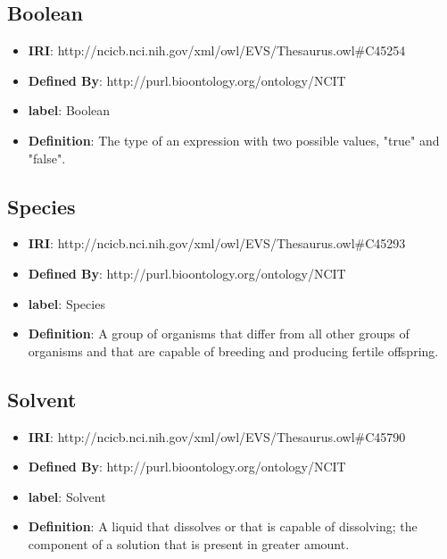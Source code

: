 \documentclass[a4paper,12pt,oneside]{article}
\begin{document}
  \subsection{Boolean}

  \begin{itemize}
     \item \textbf{IRI}: http://ncicb.nci.nih.gov/xml/owl/EVS/Thesaurus.owl\#C45254
     \item \textbf{Defined By}: http://purl.bioontology.org/ontology/NCIT
     \item \textbf{label}: Boolean
     \item \textbf{Definition}: The type of an expression with two possible values, "true" and "false".
  \end{itemize}


  \subsection{Species}

  \begin{itemize}
     \item \textbf{IRI}: http://ncicb.nci.nih.gov/xml/owl/EVS/Thesaurus.owl\#C45293
     \item \textbf{Defined By}: http://purl.bioontology.org/ontology/NCIT
     \item \textbf{label}: Species
     \item \textbf{Definition}: A group of organisms that differ from all other groups of organisms and that are capable of breeding and producing fertile offspring.
  \end{itemize}


  \subsection{Solvent}

  \begin{itemize}
     \item \textbf{IRI}: http://ncicb.nci.nih.gov/xml/owl/EVS/Thesaurus.owl\#C45790
     \item \textbf{Defined By}: http://purl.bioontology.org/ontology/NCIT
     \item \textbf{label}: Solvent
     \item \textbf{Definition}: A liquid that dissolves or that is capable of dissolving; the component of a solution that is present in greater amount.
  \end{itemize}
\end{document}
